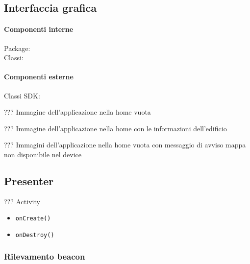 \documentclass[../Funzionalita.tex]{subfiles}
\begin{document}
		\subsection{Interfaccia grafica}
		
			\paragraph*{Componenti interne}
			\begin{description}
				\item[Package:]
				\item[Classi:]
			\end{description}
			
			\paragraph*{Componenti esterne}
			\begin{description}
				\item[Classi SDK:] 
			\end{description}
			
			??? Immagine dell'applicazione nella home vuota
			
			??? Immagine dell'applicazione nella home con le informazioni dell'edificio
			
			??? Immagini dell'applicazione nella home vuota con messaggio di avviso mappa non disponibile nel device
			
		\subsection{Presenter}
		
			??? Activity
			
			\begin{itemize}[label={-}]
				\item \verb|onCreate()|
				\item \verb|onDestroy()|
			\end{itemize}
			
		\subsubsection{Rilevamento beacon}
			
\end{document}
